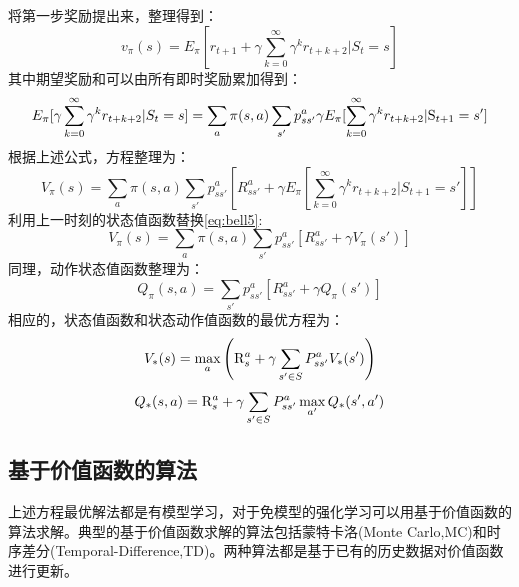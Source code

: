 将第一步奖励提出来，整理得到：
\begin{equation}
\label{eq:bell3}
{v_\pi }(s) = {E_\pi }[{r_{t + 1}} + \gamma \sum\limits_{k = 0}^\infty  {{\gamma ^k}{r_{t + k + 2}}|{S_t}}  = s]
\end{equation}
其中期望奖励和可以由所有即时奖励累加得到：
\begin{equation}
\label{eq:bell4}
{E_\pi }[\gamma \sum\limits_{k = 0}^\infty  {{\gamma ^k}{r_{t + k + 2}}|{S_t}}  = s] = \sum\limits_a {\pi (s,a)\sum\limits_{s'} {p_{ss'}^a} } \gamma {E_\pi }[\sum\limits_{k = 0}^\infty  {{\gamma ^k}{r_{t + k{\rm{ + }}2}}{\rm{|}}{{\rm{S}}_{t + 1}} = s'} ]
\end{equation}
根据上述公式，方程整理为：
\begin{equation}
\label{eq:bell5}
{V_\pi }(s) = \sum\limits_a {\pi (s,a)\sum\limits_{s'} {p_{ss'}^a} } [R_{ss'}^a + \gamma {E_\pi }[\sum\limits_{k = 0}^\infty  {{\gamma ^k}{r_{t + k + 2}}|{S_{t + 1}}}  = s']]
\end{equation}
利用上一时刻的状态值函数替换\ref{eq:bell5}:
\begin{equation}
\label{eq:bell6}
{V_\pi }(s) = \sum\limits_a {\pi (s,a)\sum\limits_{s'} {p_{ss'}^a} } [R_{ss'}^a + \gamma {V_\pi }(s')]
\end{equation}
同理，动作状态值函数整理为：
\begin{equation}
\label{eq:bell7}
{Q_\pi }(s,a) = \sum\limits_{s'} {p_{ss'}^a} [R_{ss'}^a + \gamma {Q_\pi }(s')]
\end{equation}
相应的，状态值函数和状态动作值函数的最优方程为：
\begin{equation}
\label{eq:bell8}
{V_*}(s) = \mathop {\max }\limits_a \left( {{\rm{R}}_s^a + \gamma \sum\limits_{s' \in S} {P_{ss'}^a{V_*}(s')} } \right)
\end{equation}
\begin{equation}
\label{eq:bell9}
{Q_*}(s,a) = {\rm{R}}_s^a + \gamma \sum\limits_{s' \in S} {P_{ss'}^a\mathop {\max }\limits_{a'} {Q_*}(s',a')}
\end{equation}
\subsection{基于价值函数的算法}
上述方程最优解法都是有模型学习，对于免模型的强化学习可以用基于价值函数的算法求解。典型的基于价值函数求解的算法包括蒙特卡洛(Monte Carlo,MC)\cite{singh1996reinforcement}和时序差分(Temporal-Difference,TD)\cite{tesauro1995temporal}。两种算法都是基于已有的历史数据对价值函数进行更新。

